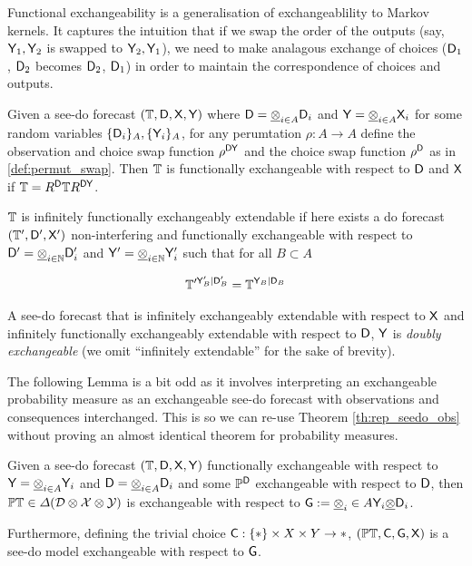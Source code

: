 Functional exchangeability is a generalisation of exchangeablility to Markov kernels. It captures the intuition that if we swap the order of the outputs (say, $\mathsf{Y}_1,\mathsf{Y}_2$ is swapped to $\mathsf{Y}_2, \mathsf{Y}_1$), we need to make analagous exchange of choices ($\mathsf{D}_1$, $\mathsf{D}_2$ becomes $\mathsf{D}_2$, $\mathsf{D}_1$) in order to maintain the correspondence of choices and outputs.



\begin{definition}
Given a see-do forecast $(\mathbb{T},\mathsf{D},\mathsf{X},\mathsf{Y})$ where $\mathsf{D}=\underline{\otimes}_{i\in A}\mathsf{D}_i$ and $\mathsf{Y}=\underline{\otimes}_{i\in A} \mathsf{X}_i$ for some random variables $\{\mathsf{D}_i\}_A, \{\mathsf{Y}_i\}_A$, for any perumtation $\rho:A\to A$ define the observation and choice swap function $\rho^{\mathsf{D}\mathsf{Y}}$ and the choice swap function $\rho^{\mathsf{D}}$ as in \ref{def:permut_swap}. Then $\mathbb{T}$ is functionally exchangeable with respect to $\mathsf{D}$ and $\mathsf{X}$ if $\mathbb{T}=R^{\mathsf{D}}\mathbb{T}R^{\mathsf{D}\mathsf{Y}}$.

$\mathbb{T}$ is infinitely functionally exchangeably extendable if here exists a do forecast $(\mathbb{T}',\mathsf{D}',\mathsf{X}')$ non-interfering and functionally exchangeable with respect to $\mathsf{D}'=\underline{\otimes}_{i\in\mathbb{N}}\mathsf{D}'_i$ and $\mathsf{Y}'=\underline{\otimes}_{i\in\mathbb{N}}\mathsf{Y}'_i$ such that for all $B\subset A$

\begin{align}
    \mathbb{T}^{\prime \mathsf{Y}'_B|\mathsf{D}'_B}=\mathbb{T}^{\mathsf{Y}_B|\mathsf{D}_B} 
\end{align}

A see-do forecast that is infinitely exchangeably extendable with respect to $\mathsf{X}$ and infinitely functionally exchangeably extendable with respect to $\mathsf{D}$, $\mathsf{Y}$ is \emph{doubly exchangeable} (we omit ``infinitely extendable'' for the sake of brevity).

\end{definition}

The following Lemma is a bit odd as it involves interpreting an exchangeable probability measure as an exchangeable see-do forecast with observations and consequences interchanged. This is so we can re-use Theorem \ref{th:rep_seedo_obs} without proving an almost identical theorem for probability measures.

\begin{lemma}\label{lem:f-ex2ex}
Given a see-do forecast $(\mathbb{T},\mathsf{D},\mathsf{X},\mathsf{Y})$ functionally exchangeable with respect to $\mathsf{Y}=\underline{\otimes}_{i\in A} \mathsf{Y}_i$ and $\mathsf{D}=\underline{\otimes}_{i\in A}\mathsf{D}_i$ and some $\mathbb{P}^{\mathsf{D}}$ exchangeable with respect to $\mathsf{D}$, then $\mathbb{P}\mathbb{T}\in \Delta(\mathcal{D}\otimes\mathcal{X}\otimes\mathcal{Y})$ is exchangeable with respect to $\mathsf{G}:=\underline{\otimes}_i\in A \mathsf{Y}_i\underline{\otimes}\mathsf{D}_i$. 

Furthermore, defining the trivial choice $\mathsf{C}:\{*\}\times X\times Y\to *$, $(\mathbb{P}\mathbb{T},\mathsf{C},\mathsf{G},\mathsf{X})$ is a see-do model exchangeable with respect to $\mathsf{G}$.
\end{lemma}


